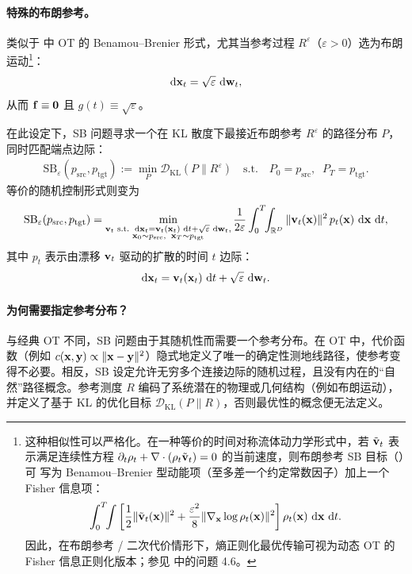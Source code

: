 \paragraph{特殊的布朗参考。}
 类似于  中 OT 的 Benamou--Brenier 形式，尤其当参考过程 $R^\varepsilon$（$\varepsilon>0$）选为布朗
运动\footnote{这种相似性可以严格化。在一种等价的时间对称流体动力学形式中，若 $\tilde{{\mathbf{v}}}_t$ 表示满足连续性方程
$\partial_t \rho_t + \nabla \cdot (\rho_t \tilde{{\mathbf{v}}}_t)=0$ 的当前速度，则布朗参考 SB 目标（）可
写为 Benamou--Brenier 型动能项（至多差一个约定常数因子）加上一个 Fisher 信息项：
\[
\int_0^T\!\!\int
\left[
\frac{1}{2}\|\tilde{{\mathbf{v}}}_t({\mathbf{x}})\|^2
+
\frac{\varepsilon^2}{8}\|\nabla_{{\mathbf{x}}}\log \rho_t({\mathbf{x}})\|^2
\right]\rho_t({\mathbf{x}})\,\mathop{}\!\mathrm{d}{\mathbf{x}}\,\mathop{}\!\mathrm{d} t.
\]
因此，在布朗参考 / 二次代价情形下，熵正则化最优传输可视为动态 OT 的 Fisher 信息正则化版本；参见
\citet{chen2021stochastic} 中的问题 4.6。}：
\[
\mathop{}\!\mathrm{d} {\mathbf{x}}_t = \sqrt{\varepsilon}\,\mathop{}\!\mathrm{d}{\mathbf{w}}_t,
\]
从而 ${\mathbf{f}} \equiv \mathbf{0}$ 且 $g(t) \equiv \sqrt{\varepsilon}$。

在此设定下，SB 问题寻求一个在 KL 散度下最接近布朗参考 $R^\varepsilon$ 的路径分布 $P$，同时匹配端点边际：
\begin{align}\label{eq:sb-epsilon}
    \mathrm{SB}_\varepsilon(p_{\mathrm{src}}, p_{\mathrm{tgt}})
    := \min_{P} \mathcal{D}_{\mathrm{KL}}(P \| R^\varepsilon)
    \quad \text{s.t.} \quad P_0 = p_{\mathrm{src}}, \;\; P_T = p_{\mathrm{tgt}}.
\end{align}
等价的随机控制形式则变为
\begin{align}\label{eq:sb-epsilon-kinetic}
\begin{aligned}
    \mathrm{SB}_\varepsilon(p_{\mathrm{src}}, p_{\mathrm{tgt}})
    = \min_{\substack{
        {\mathbf{v}}_t \text{ s.t. } \mathop{}\!\mathrm{d} {\mathbf{x}}_t = {\mathbf{v}}_t({\mathbf{x}}_t)\,\mathop{}\!\mathrm{d} t + \sqrt{\varepsilon}\,\mathop{}\!\mathrm{d} {\mathbf{w}}_t, \\
        {\mathbf{x}}_0 \sim p_{\mathrm{src}},\;\; {\mathbf{x}}_T \sim p_{\mathrm{tgt}}
    }}
    \frac{1}{2\varepsilon}\int_0^T \!\!\int_{\mathbb{R}^D}
        \|{\mathbf{v}}_t({\mathbf{x}})\|^2 \, p_t({\mathbf{x}})\,\mathop{}\!\mathrm{d} {\mathbf{x}}\,\mathop{}\!\mathrm{d} t,
\end{aligned}
\end{align}
其中 $p_t$ 表示由漂移 ${\mathbf{v}}_t$ 驱动的扩散的时间 $t$ 边际：
\[
\mathop{}\!\mathrm{d} {\mathbf{x}}_t = {\mathbf{v}}_t({\mathbf{x}}_t)\,\mathop{}\!\mathrm{d} t + \sqrt{\varepsilon}\,\mathop{}\!\mathrm{d} {\mathbf{w}}_t.
\]



\paragraph{为何需要指定参考分布？} 
与经典 OT 不同，SB 问题由于其随机性而需要一个参考分布。在 OT 中，代价函数（例如 $c({\mathbf{x}}, {\mathbf{y}}) \propto \|{\mathbf{x}} - {\mathbf{y}}\|^2$）隐式地定义了唯一的确定性测地线路径，使参考变得不必要。相反，SB 设定允许无穷多个连接边际的随机过程，且没有内在的“自然”路径概念。参考测度 $R$ 编码了系统潜在的物理或几何结构（例如布朗运动），并定义了基于 KL 的优化目标 $\mathcal{D}_{\mathrm{KL}}(P \| R)$，否则最优性的概念便无法定义。



